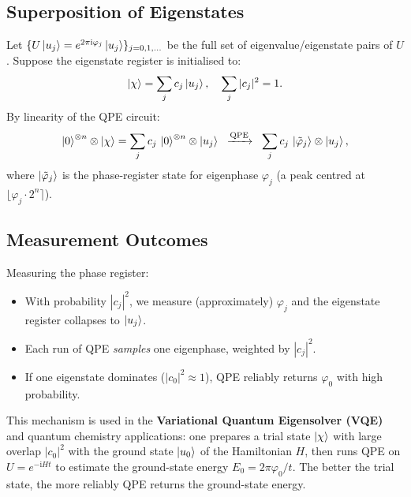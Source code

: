 \documentclass[12pt,a4paper]{article}
\newcommand{\QPE}{\textsc{QPE}}
\newcommand{\ii}{\mathrm{i}}
\begin{document}
\subsection{Superposition of Eigenstates}

Let $\{U\Ket{u_j} = e^{2\pi\ii\varphi_j}\Ket{u_j}\}_{j=0,1,\ldots}$ be the
full set of eigenvalue/eigenstate pairs of $U$.  Suppose the eigenstate
register is initialised to:
\[
  \Ket{\chi} = \sum_j c_j \Ket{u_j}, \quad \sum_j |c_j|^2 = 1.
\]
By linearity of the \QPE{} circuit:
\[
  \Ket{0}^{\otimes n}\otimes\Ket{\chi}
  = \sum_j c_j \,\Ket{0}^{\otimes n}\otimes\Ket{u_j}
  \;\;\xrightarrow{\text{QPE}}\;\;
  \sum_j c_j \,\Ket{\tilde\varphi_j}\otimes\Ket{u_j},
\]
where $\Ket{\tilde\varphi_j}$ is the phase-register state for eigenphase
$\varphi_j$ (a peak centred at $\lfloor\varphi_j\cdot 2^n\rceil$).

\subsection{Measurement Outcomes}

Measuring the phase register:
\begin{itemize}[leftmargin=*]
  \item With probability $|c_j|^2$, we measure (approximately) $\varphi_j$
        and the eigenstate register collapses to $\Ket{u_j}$.
  \item Each run of \QPE{} \emph{samples} one eigenphase, weighted by $|c_j|^2$.
  \item If one eigenstate dominates ($|c_0|^2 \approx 1$), \QPE{} reliably
        returns $\varphi_0$ with high probability.
\end{itemize}

\begin{tcolorbox}[insight]
  This mechanism is used in the \textbf{Variational Quantum Eigensolver (VQE)}
  and quantum chemistry applications: one prepares a trial state $\Ket{\chi}$
  with large overlap $|c_0|^2$ with the ground state $\Ket{u_0}$ of the
  Hamiltonian $H$, then runs \QPE{} on $U = e^{-\ii H t}$ to estimate the
  ground-state energy $E_0 = 2\pi\varphi_0/t$.  The better the trial state,
  the more reliably \QPE{} returns the ground-state energy.
\end{tcolorbox}

\newpage

\end{document}
